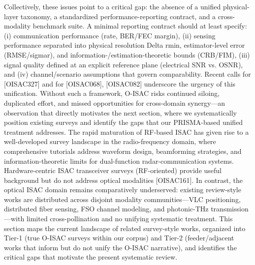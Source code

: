 {} Collectively, these issues point to a critical gap: the absence of a unified physical-layer taxonomy, a standardized performance-reporting contract, and a cross-modality benchmark suite. A minimal reporting contract should at least specify: (i) communication performance (rate, BER/FEC margin), (ii) sensing performance separated into physical resolution \markdownRendererDollarSign{}\markdownRendererBackslash{}Delta r\markdownRendererUnderscore{}\markdownRendererLeftBrace{}\markdownRendererBackslash{}min\markdownRendererRightBrace{}\markdownRendererDollarSign{}, estimator-level error (RMSE/\markdownRendererDollarSign{}\markdownRendererBackslash{}sigma\markdownRendererUnderscore{}r\markdownRendererDollarSign{}), and information-/estimation-theoretic bounds (CRB/FIM), (iii) signal quality defined at an explicit reference plane (electrical SNR vs. OSNR), and (iv) channel/scenario assumptions that govern comparability. Recent calls for  [O\markdownRendererUnderscore{}ISAC\markdownRendererUnderscore{}327] and for  [O\markdownRendererUnderscore{}ISAC\markdownRendererUnderscore{}068], [O\markdownRendererUnderscore{}ISAC\markdownRendererUnderscore{}082] underscore the urgency of this unification. Without such a framework, O-ISAC risks continued siloing, duplicated effort, and missed opportunities for cross-domain synergy—an observation that directly motivates the next section, where we systematically position existing surveys and identify the gaps that our PRISMA-based unified treatment addresses.\markdownRendererInterblockSeparator
{}
\markdownRendererSectionEnd \markdownRendererSectionBegin
{}\markdownRendererInterblockSeparator
{}The rapid maturation of RF-based ISAC has given rise to a well-developed survey landscape in the radio-frequency domain, where comprehensive tutorials address waveform design, beamforming strategies, and information-theoretic limits for dual-function radar-communication systems. Hardware-centric ISAC transceiver surveys (RF-oriented) provide useful background but do not address optical modalities [O\markdownRendererUnderscore{}ISAC\markdownRendererUnderscore{}161]. In contrast, the optical ISAC domain remains comparatively underserved: existing review-style works are distributed across disjoint modality communities—VLC positioning, distributed fiber sensing, FSO channel modeling, and photonic-THz transmission—with limited cross-pollination and no unifying systematic treatment. This section maps the current landscape of related survey-style works, organized into Tier-1 (true O-ISAC surveys within our corpus) and Tier-2 (feeder/adjacent works that inform but do not unify the O-ISAC narrative), and identifies the critical gaps that motivate the present systematic review.\markdownRendererParagraphSeparator
